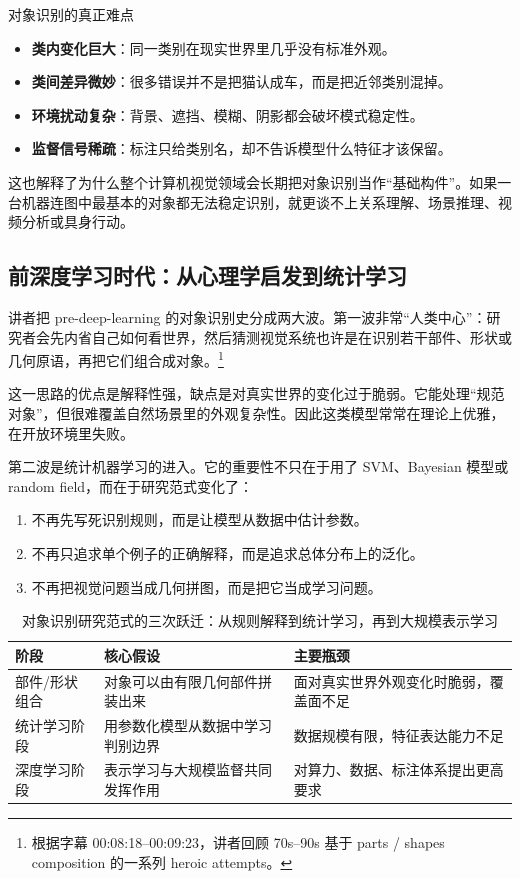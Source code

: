 \documentclass[a4paper]{article}
\begin{document}
\begin{knowledgebox}{对象识别的真正难点}
\begin{itemize}
    \item \textbf{类内变化巨大}：同一类别在现实世界里几乎没有标准外观。
    \item \textbf{类间差异微妙}：很多错误并不是把猫认成车，而是把近邻类别混掉。
    \item \textbf{环境扰动复杂}：背景、遮挡、模糊、阴影都会破坏模式稳定性。
    \item \textbf{监督信号稀疏}：标注只给类别名，却不告诉模型什么特征才该保留。
\end{itemize}
\end{knowledgebox}

这也解释了为什么整个计算机视觉领域会长期把对象识别当作``基础构件''。如果一台机器连图中最基本的对象都无法稳定识别，就更谈不上关系理解、场景推理、视频分析或具身行动。

\subsection{前深度学习时代：从心理学启发到统计学习}

讲者把 pre-deep-learning 的对象识别史分成两大波。第一波非常``人类中心''：研究者会先内省自己如何看世界，然后猜测视觉系统也许是在识别若干部件、形状或几何原语，再把它们组合成对象。\footnote{根据字幕 00:08:18--00:09:23，讲者回顾 70s--90s 基于 parts / shapes composition 的一系列 heroic attempts。}

这一思路的优点是解释性强，缺点是对真实世界的变化过于脆弱。它能处理``规范对象''，但很难覆盖自然场景里的外观复杂性。因此这类模型常常在理论上优雅，在开放环境里失败。

第二波是统计机器学习的进入。它的重要性不只在于用了 SVM、Bayesian 模型或 random field，而在于研究范式变化了：

\begin{enumerate}
    \item 不再先写死识别规则，而是让模型从数据中估计参数。
    \item 不再只追求单个例子的正确解释，而是追求总体分布上的泛化。
    \item 不再把视觉问题当成几何拼图，而是把它当成学习问题。
\end{enumerate}

\begin{table}[H]
\centering
\begin{tabular}{p{3cm}p{4cm}p{5.5cm}}
\toprule
\textbf{阶段} & \textbf{核心假设} & \textbf{主要瓶颈} \\
\midrule
部件/形状组合 & 对象可以由有限几何部件拼装出来 & 面对真实世界外观变化时脆弱，覆盖面不足 \\
统计学习阶段 & 用参数化模型从数据中学习判别边界 & 数据规模有限，特征表达能力不足 \\
深度学习阶段 & 表示学习与大规模监督共同发挥作用 & 对算力、数据、标注体系提出更高要求 \\
\bottomrule
\end{tabular}
\caption{对象识别研究范式的三次跃迁：从规则解释到统计学习，再到大规模表示学习}
\end{table}
\end{document}
